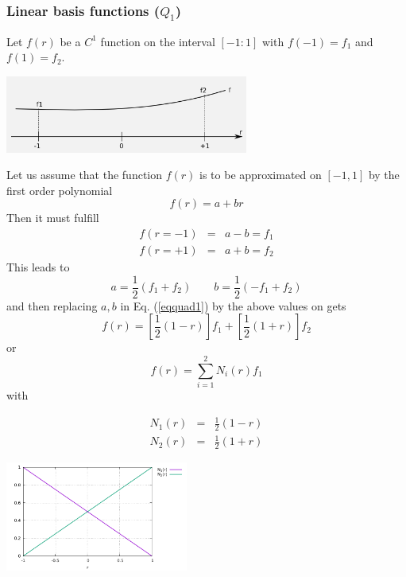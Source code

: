 
\subsubsection{Linear basis functions ($Q_1$) \label{sec:bf1}}

Let $f(r)$ be a $C^1$ function on the interval $[-1:1]$ with $f(-1)=f_1$  and $f(1)=f_2$.
\begin{center}
\includegraphics[width=8cm]{images/linshapefct.png}
\end{center}
Let us assume that the function $f(r)$ is to be approximated on $[-1,1]$ by the first order polynomial 
\begin{equation}
f(r)=a+br \label{eqquad1}
\end{equation}
Then it must fulfill
\begin{eqnarray}
f(r=-1)&=&a-b =f_1 \nonumber\\
f(r=+1)&=&a+b =f_2 \nonumber
\end{eqnarray}
This leads to  
\[
a=\frac{1}{2}(f_1+f_2)  
\quad\quad
b=\frac{1}{2}(-f_1+f_2)  
\]
and then replacing $a,b$ in Eq. (\ref{eqquad1}) by the above values on gets
\[
f(r) = \left[  \frac{1}{2}(1-r)\right] f_1 + \left[ \frac{1}{2}(1+r) \right] f_2
\]
or
\[
f(r)=\sum_{i=1}^2 N_i(r) f_1
\]
with
\begin{mdframed}[backgroundcolor=blue!5]
\begin{eqnarray}
N_1(r) &=& \frac{1}{2} (1-r) \nonumber\\
N_2(r) &=& \frac{1}{2} (1+r)
\end{eqnarray}
\end{mdframed}

\begin{center}
\includegraphics[width=6cm]{images/basis1D/linear.pdf}
\end{center}

